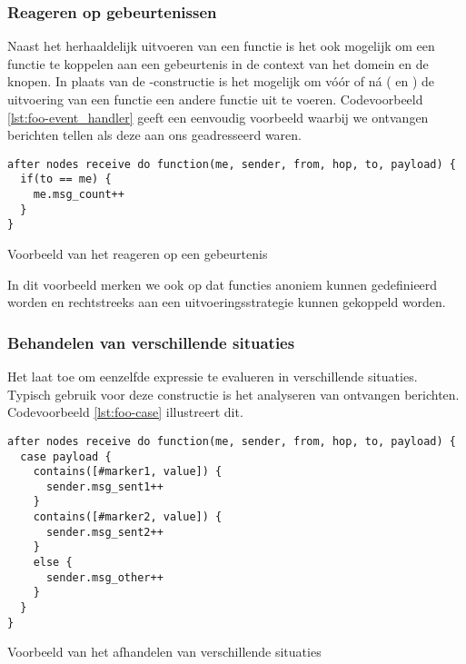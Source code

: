 \vspace{-3mm}

\subsubsection{Reageren op gebeurtenissen}

Naast het herhaaldelijk uitvoeren van een functie is het ook mogelijk om een
functie te koppelen aan een gebeurtenis in de context van het domein en de
knopen. In plaats van de -constructie is het mogelijk om
v\'o\'or of n\'a ( en ) de uitvoering van een functie
een andere functie uit te voeren. Codevoorbeeld \ref{lst:foo-event_handler}
geeft een eenvoudig voorbeeld waarbij we ontvangen berichten tellen als deze
aan ons geadresseerd waren.

\begin{listing}[ht]
  \begin{verbatim}
after nodes receive do function(me, sender, from, hop, to, payload) {
  if(to == me) {
    me.msg_count++
  }
}
  \end{verbatim}
  \vspace{-5mm}
  \caption{Voorbeeld van het reageren op een gebeurtenis}
  \label{lst:foo-event_handler}
\end{listing}

In dit voorbeeld merken we ook op dat functies anoniem kunnen gedefinieerd
worden en rechtstreeks aan een uitvoeringsstrategie kunnen gekoppeld worden.

\vspace{-3mm}

\subsubsection{Behandelen van verschillende situaties}

Het  laat toe om eenzelfde expressie te evalueren in
verschillende situaties. Typisch gebruik voor deze constructie is het
analyseren van ontvangen berichten. Codevoorbeeld \ref{lst:foo-case}
illustreert dit.

\begin{listing}[ht]
  \begin{verbatim}
after nodes receive do function(me, sender, from, hop, to, payload) {
  case payload {
    contains([#marker1, value]) {
      sender.msg_sent1++
    }
    contains([#marker2, value]) {
      sender.msg_sent2++
    }
    else {
      sender.msg_other++
    }
  }
}
  \end{verbatim}
  \vspace{-5mm}
  \caption{Voorbeeld van het afhandelen van verschillende situaties}
  \label{lst:foo-case}
\end{listing}

